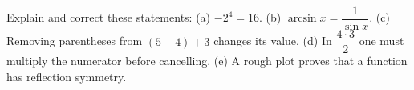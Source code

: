 Explain and correct these statements: (a) $-2^4=16$. (b) $\arcsin x=\dfrac{1}{\sin x}$. (c) Removing parentheses from $(5-4)+3$ changes its value. (d) In $\dfrac{4\cdot3}{2}$ one must multiply the numerator before cancelling. (e) A rough plot proves that a function has reflection symmetry.
